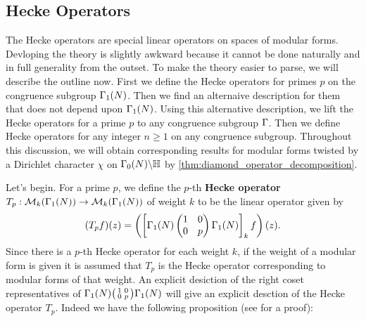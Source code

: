     \subsection*{Hecke Operators}
      The Hecke operators are special linear operators on spaces of modular forms. Devloping the theory is slightly awkward because it cannot be done naturally and in full generality from the outset. To make the theory easier to parse, we will describe the outline now. First we define the Hecke operators for primes $p$ on the congruence subgroup $\Gamma_{1}(N)$. Then we find an alternaive description for them that does not depend upon $\Gamma_{1}(N)$. Using this alternative description, we lift the Hecke operators for a prime $p$ to any congruence subgroup $\Gamma$. Then we define Hecke operators for any integer $n \ge 1$ on any congruence subgroup. Throughout this discussion, we will obtain corresponding results for modular forms twisted by a Dirichlet character $\chi$ on $\Gamma_{0}(N)\backslash\mathbb{H}$ by \cref{thm:diamond_operator_decomposition}.
      
      Let's begin. For a prime $p$, we define the $p$-th \textbf{Hecke operator} $T_{p}:\mathcal{M}_{k}(\Gamma_{1}(N)) \to \mathcal{M}_{k}(\Gamma_{1}(N))$ of weight $k$ to be the linear operator given by
      \[
        (T_{p}f)(z) = \left(\left[\Gamma_{1}(N)\begin{pmatrix} 1 & 0 \\ 0 & p \end{pmatrix}\Gamma_{1}(N)\right]_{k}f\right)(z).
      \]
      Since there is a $p$-th Hecke operator for each weight $k$, if the weight of a modular form is given it is assumed that $T_{p}$ is the Hecke operator corresponding to modular forms of that weight. An explicit desiction of the right coset representatives of $\Gamma_{1}(N)\begin{psmallmatrix} 1 & 0 \\ 0 & p \end{psmallmatrix}\Gamma_{1}(N)$ will give an explicit desction of the Hecke operator $T_{p}$. Indeed we have the following proposition (see \cite{diamond2005first} for a proof):

